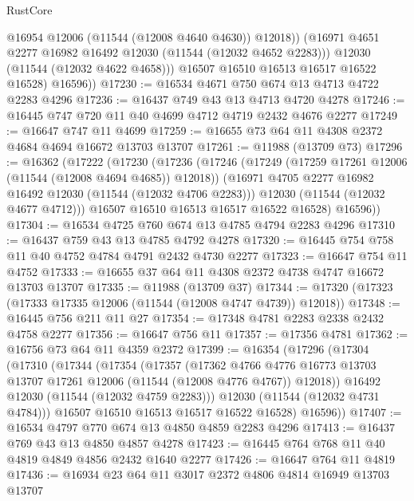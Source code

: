 \begin{lexlean}{RustCore}
\begin{coremodule}
                @16954
                @12006
                (@11544 (@12008 @4640 @4630))
                @12018))
            (@16971 @4651 @2277 @16982 @16492 @12030 (@11544 (@12032 @4652 @2283)))
            @12030
            (@11544 (@12032 @4622 @4658)))
          @16507
          @16510
          @16513
          @16517
          @16522
          @16528)
        @16596))
@17230 := @16534 @4671 @750 @674 @13 @4713 @4722 @2283 @4296
@17236 := @16437 @749 @43 @13 @4713 @4720 @4278
@17246 := @16445 @747 @720 @11 @40 @4699 @4712 @4719 @2432 @4676 @2277
@17249 := @16647 @747 @11 @4699
@17259 := @16655 @73 @64 @11 @4308 @2372 @4684 @4694 @16672 @13703 @13707
@17261 := @11988 (@13709 @73)
@17296 := @16362
    (@17222
      (@17230
        (@17236
          (@17246
            (@17249 (@17259 @17261 @12006 (@11544 (@12008 @4694 @4685)) @12018))
            (@16971 @4705 @2277 @16982 @16492 @12030 (@11544 (@12032 @4706 @2283)))
            @12030
            (@11544 (@12032 @4677 @4712)))
          @16507
          @16510
          @16513
          @16517
          @16522
          @16528)
        @16596))
@17304 := @16534 @4725 @760 @674 @13 @4785 @4794 @2283 @4296
@17310 := @16437 @759 @43 @13 @4785 @4792 @4278
@17320 := @16445 @754 @758 @11 @40 @4752 @4784 @4791 @2432 @4730 @2277
@17323 := @16647 @754 @11 @4752
@17333 := @16655 @37 @64 @11 @4308 @2372 @4738 @4747 @16672 @13703 @13707
@17335 := @11988 (@13709 @37)
@17344 := @17320 (@17323 (@17333 @17335 @12006 (@11544 (@12008 @4747 @4739)) @12018))
@17348 := @16445 @756 @211 @11 @27
@17354 := @17348 @4781 @2283 @2338 @2432 @4758 @2277
@17356 := @16647 @756 @11
@17357 := @17356 @4781
@17362 := @16756 @73 @64 @11 @4359 @2372
@17399 := @16354
    (@17296
      (@17304
        (@17310
          (@17344
            (@17354
              (@17357
                (@17362
                  @4766
                  @4776
                  @16773
                  @13703
                  @13707
                  @17261
                  @12006
                  (@11544 (@12008 @4776 @4767))
                  @12018))
              @16492
              @12030
              (@11544 (@12032 @4759 @2283)))
            @12030
            (@11544 (@12032 @4731 @4784)))
          @16507
          @16510
          @16513
          @16517
          @16522
          @16528)
        @16596))
@17407 := @16534 @4797 @770 @674 @13 @4850 @4859 @2283 @4296
@17413 := @16437 @769 @43 @13 @4850 @4857 @4278
@17423 := @16445 @764 @768 @11 @40 @4819 @4849 @4856 @2432 @1640 @2277
@17426 := @16647 @764 @11 @4819
@17436 := @16934 @23 @64 @11 @3017 @2372 @4806 @4814 @16949 @13703 @13707

\end{coremodule}
\end{lexlean}
